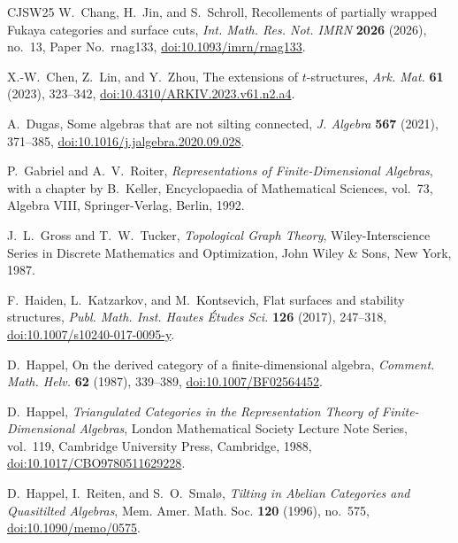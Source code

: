 \documentclass[11pt]{amsart}
\theoremstyle{definition}
\theoremstyle{plain}
\theoremstyle{definition}
\theoremstyle{definition}
\begin{document}
\begin{thebibliography}{CJSW25}
W.~Chang, H.~Jin, and S.~Schroll,
\newblock Recollements of partially wrapped Fukaya categories and surface cuts,
\newblock \emph{Int. Math. Res. Not. IMRN} \textbf{2026} (2026), no.~13,
Paper No.~rnag133,
\newblock \href{https://doi.org/10.1093/imrn/rnag133}
{doi:10.1093/imrn/rnag133}.


X.-W.~Chen, Z.~Lin, and Y.~Zhou,
\newblock The extensions of $t$-structures,
\newblock \emph{Ark. Mat.} \textbf{61} (2023), 323--342,
\newblock
\href{https://doi.org/10.4310/ARKIV.2023.v61.n2.a4}
{doi:10.4310/ARKIV.2023.v61.n2.a4}.


A.~Dugas,
\newblock Some algebras that are not silting connected,
\newblock \emph{J. Algebra} \textbf{567} (2021), 371--385,
\newblock \href{https://doi.org/10.1016/j.jalgebra.2020.09.028}
{doi:10.1016/j.jalgebra.2020.09.028}.

P.~Gabriel and A.~V.~Roiter,
\newblock \emph{Representations of Finite-Dimensional Algebras},
\newblock with a chapter by B.~Keller,
\newblock Encyclopaedia of Mathematical Sciences, vol.~73, Algebra VIII,
Springer-Verlag, Berlin, 1992.

J.~L.~Gross and T.~W.~Tucker,
\newblock \emph{Topological Graph Theory},
\newblock Wiley-Interscience Series in Discrete Mathematics and Optimization,
John Wiley \& Sons, New York, 1987.

F.~Haiden, L.~Katzarkov, and M.~Kontsevich,
\newblock Flat surfaces and stability structures,
\newblock \emph{Publ. Math. Inst. Hautes \'Etudes Sci.} \textbf{126}
(2017), 247--318,
\newblock \href{https://doi.org/10.1007/s10240-017-0095-y}
{doi:10.1007/s10240-017-0095-y}.


D.~Happel,
\newblock On the derived category of a finite-dimensional algebra,
\newblock \emph{Comment. Math. Helv.} \textbf{62} (1987), 339--389,
\newblock \href{https://doi.org/10.1007/BF02564452}
{doi:10.1007/BF02564452}.

D.~Happel,
\newblock \emph{Triangulated Categories in the Representation Theory of
Finite-Dimensional Algebras},
\newblock London Mathematical Society Lecture Note Series, vol.~119,
Cambridge University Press, Cambridge, 1988,
\newblock \href{https://doi.org/10.1017/CBO9780511629228}
{doi:10.1017/CBO9780511629228}.


D.~Happel, I.~Reiten, and S.~O.~Smal\o,
\newblock \emph{Tilting in Abelian Categories and Quasitilted Algebras},
\newblock Mem. Amer. Math. Soc. \textbf{120} (1996), no.~575,
\newblock \href{https://doi.org/10.1090/memo/0575}
{doi:10.1090/memo/0575}.


\end{thebibliography}
\end{document}
